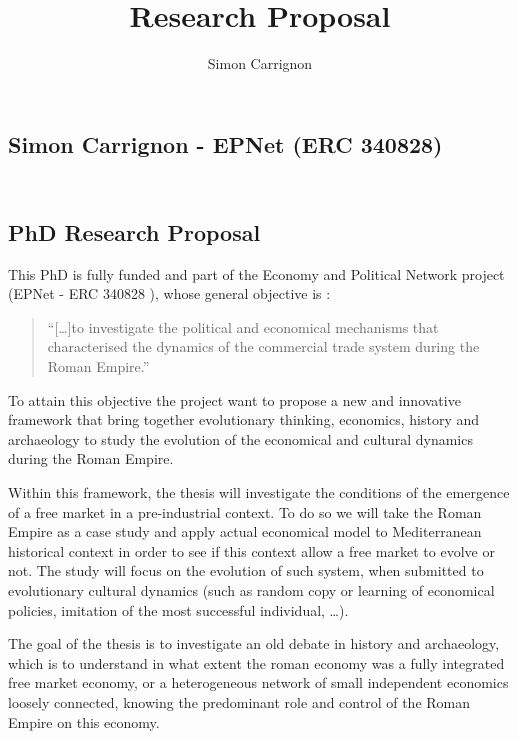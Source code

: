 \documentclass[a4paper]{article}
\title{Research Proposal}
\author{Simon Carrignon}
\begin{document}
\subsection*{Simon Carrignon - EPNet (ERC 340828)}
\subsection*{\\PhD Research Proposal}

This PhD is fully funded and part of the Economy and Political Network project (EPNet - ERC 340828 ), whose general objective is :
\begin{quote}
	``[\ldots]to investigate the political and economical mechanisms that characterised the dynamics of the commercial trade system during the Roman Empire.''
\end{quote}
To attain this objective the project want to propose a new and innovative framework that bring together evolutionary thinking, economics, history and archaeology to study the evolution of the economical and cultural dynamics during the Roman Empire. 

Within this framework, the thesis will investigate the conditions of the emergence of a free market in a pre-industrial context. To do so we will take the Roman Empire as a case study and apply actual economical model to Mediterranean historical context in order to see if this context allow a free market to evolve or not. The study will focus on the evolution of such system, when submitted to evolutionary cultural dynamics (such as random copy or learning of economical policies, imitation of the most successful individual, \ldots).



The goal of the thesis is to investigate an old debate in history and archaeology, which is to understand in what extent the roman economy was a fully integrated free market economy, or a heterogeneous network of small independent economics loosely connected, knowing the predominant role and control of the Roman Empire on this economy. 
 
\end{document}
